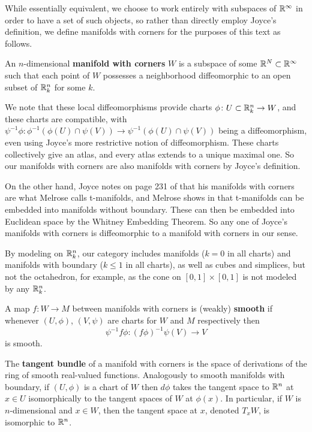 While essentially equivalent, we choose to work entirely with subspaces of $\mathbb{R}^\infty$ in order to have a set of such objects, so rather than directly employ Joyce's definition, we define manifolds with corners for the purposes of this text as follows.

\begin{definition}\label{D: MWC}
	An $n$-dimensional \textbf{manifold with corners} $W$ is a subspace of some $\mathbb{R}^N \subset \mathbb{R}^\infty$ such that each point of $W$ possesses a neighborhood diffeomorphic to an open subset of $\mathbb{R}^n_k$ for some $k$.
\end{definition}

We note that these local diffeomorphisms provide charts $\phi \colon U \subset \mathbb{R}^n_k \to W$, and these charts are compatible, with $\psi^{-1}\phi \colon \phi^{-1}(\phi(U) \cap \psi(V)) \to \psi^{-1}(\phi(U) \cap \psi(V))$ being a diffeomorphism, even using Joyce's more restrictive notion of diffeomorphism.
These charts collectively give an atlas, and every atlas extends to a unique maximal one.
So our manifolds with corners are also manifolds with corners by Joyce's definition.

On the other hand, Joyce notes on page 231 of \cite{Joy12} that his manifolds with corners are what Melrose calls t-manifolds, and Melrose shows in \cite[Proposition 1.15.1]{Melrose} that t-manifolds can be embedded into manifolds without boundary.
These can then be embedded into Euclidean space by the Whitney Embedding Theorem.
So any one of Joyce's manifolds with corners is diffeomorphic to a manifold with corners in our sense.

By modeling on $\mathbb{R}^n_k$, our category includes manifolds ($k = 0$ in all charts) and manifolds with boundary ($k \leq 1$ in all charts), as well as cubes and simplices, but not the octahedron, for example, as the cone on $[0,1] \times [0,1]$ is not modeled by any $\mathbb{R}^n_k$.

\begin{comment}
	The smooth real-valued functions on a manifold with corners $W$ are those $f$ such that for each chart $\phi \colon U \subset \R^n_k \to W$ the composition $f \circ \phi \colon U \to \R$ is smooth.
\end{comment}

\begin{definition}
	A map $f \colon W \to M$ between manifolds with corners is {(weakly) \bf smooth} if whenever $(U,\phi)$, $(V,\psi)$ are charts for $W$ and $M$ respectively then
	$$\psi^{-1}f \phi \colon (f\phi)^{-1}\psi(V) \to V$$
	is smooth.

	The \textbf{tangent bundle} of a manifold with corners is the space of derivations of the ring of smooth real-valued functions.
	Analogously to smooth manifolds with boundary, if $(U,\phi)$ is a chart of $W$ then $d\phi$ takes the tangent space to $\mathbb{R}^n$ at $x \in U$ isomorphically to the tangent spaces of $W$ at $\phi(x)$.
	In particular, if $W$ is $n$-dimensional and $x \in W$, then the tangent space at $x$, denoted $T_xW$, is isomorphic to $\mathbb{R}^n$.
\end{definition}

